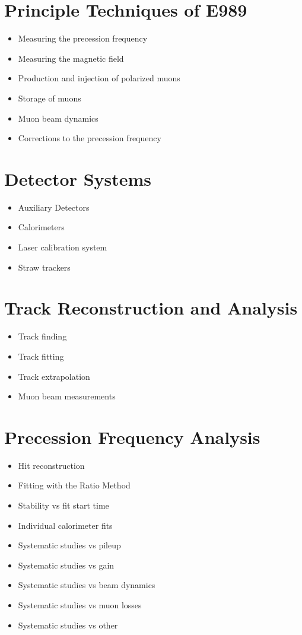 \documentclass[12pt,letterpaper]{article}
\begin{document}
\section{Principle Techniques of E989}

\begin{itemize}
	\item{Measuring the precession frequency}
	\item{Measuring the magnetic field}
	\item{Production and injection of polarized muons}
	\item{Storage of muons}
	\item{Muon beam dynamics}
	\item{Corrections to the precession frequency}
\end{itemize}

\section{Detector Systems}

\begin{itemize}
	\item{Auxiliary Detectors}
	\item{Calorimeters}
	\item{Laser calibration system}
	\item{Straw trackers}
\end{itemize}

\section{Track Reconstruction and Analysis}

\begin{itemize}
	\item{Track finding}
	\item{Track fitting}
	\item{Track extrapolation}
	\item{Muon beam measurements}
\end{itemize}

\section{Precession Frequency Analysis}

\begin{itemize}
	\item{Hit reconstruction}
	\item{Fitting with the Ratio Method}
	\item{Stability vs fit start time}
	\item{Individual calorimeter fits}
	\item{Systematic studies vs pileup} 
	\item{Systematic studies vs gain}
	\item{Systematic studies vs beam dynamics} 
 	\item{Systematic studies vs muon losses} 
	\item{Systematic studies vs other} 
\end{itemize}
\end{document}
